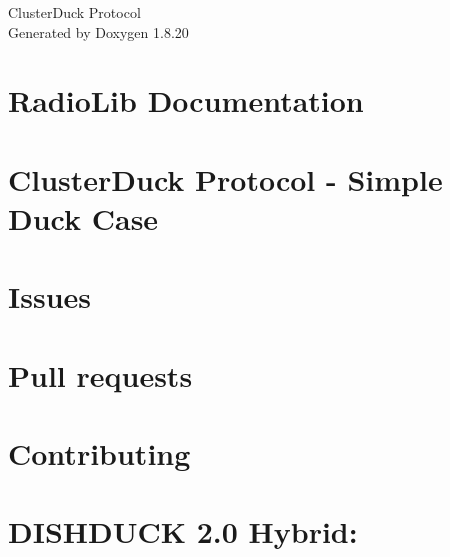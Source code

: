 \let\mypdfximage\pdfximage\def\pdfximage{\immediate\mypdfximage}\documentclass[twoside]{book}
\newcommand{\+}{\discretionary{\mbox{\scriptsize$\hookleftarrow$}}{}{}}
\newcommand{\clearemptydoublepage}{%
  \newpage{\pagestyle{empty}\cleardoublepage}%
}
\begin{document}
\hypersetup{pageanchor=false,
             bookmarksnumbered=true,
             pdfencoding=unicode
            }
\begin{titlepage}
\vspace*{7cm}
\begin{center}%
{\Large Cluster\+Duck Protocol }\\
\vspace*{1cm}
{\large Generated by Doxygen 1.8.20}\\
\end{center}
\end{titlepage}
\clearemptydoublepage
{}
\tableofcontents
\clearemptydoublepage
{}
\hypersetup{pageanchor=true}

\chapter{Radio\+Lib Documentation}
\label{index}\hypertarget{index}{}
\chapter{Cluster\+Duck Protocol -\/ Simple Duck Case}
\label{md_3_d-_print-_files__r_e_a_d_m_e}

\chapter{Issues}
\label{md_contributing__i_s_s_u_e_s}

\chapter{Pull requests}
\label{md_contributing__p_u_l_l-_r_e_q_u_e_s_t_s}

\chapter{Contributing}
\label{md__c_o_n_t_r_i_b_u_t_i_n_g}

\chapter{D\+I\+S\+H\+D\+U\+CK 2.0 Hybrid\+:}
\label{md_examples__papa-_iridium-_example__dish_duck__hybrid__r_e_a_d_m_e}

\end{document}
